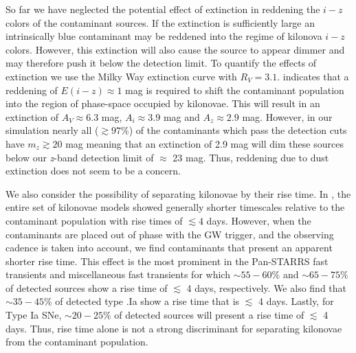 So far we have neglected the potential effect of extinction in reddening the $i-z$ colors of the contaminant sources. If the extinction is sufficiently large an intrinsically blue contaminant may be reddened into the regime of kilonova $i-z$ colors. However, this extinction will also cause the source to appear dimmer and may therefore push it below the detection limit. To quantify the effects of extinction we use the Milky Way extinction curve with $R_V = 3.1$.  indicates that a reddening of $E(i-z) \approx 1$ mag is required to shift the contaminant population into the region of phase-space occupied by kilonovae. This will result in an extinction of $A_V \approx 6.3$ mag, $A_i \approx 3.9$ mag and $A_z \approx 2.9$ mag.  However, in our simulation nearly all ($\gtrsim 97\%$) of the contaminants which pass the detection cuts have $m_z \gtrsim 20$ mag meaning that an extinction of 2.9 mag will dim these sources below our {\em z}-band detection limit of $\approx$ 23 mag. Thus, reddening due to dust extinction does not seem to be a concern.

\clearpage
We also consider the possibility of separating kilonovae by their rise time. In , the entire set of kilonovae models showed generally shorter timescales relative to the contaminant population with rise times of $\lesssim4$ days. However, when the contaminants are placed out of phase with the GW trigger, and the observing cadence is taken into account, we find contaminants that present an apparent shorter rise time. This effect is the most prominent in the Pan-STARRS fast transients and miscellaneous fast transients for which $\sim55-60\%$ and $\sim65-75\%$ of detected sources show a rise time of $\lesssim$ 4 days, respectively. We also find that $\sim 35-45\%$ of detected type .Ia show a rise time that is $\lesssim$ 4 days. Lastly, for Type Ia SNe, $\sim20-25\%$ of detected sources will present a rise time of $\lesssim$ 4 days. Thus, rise time alone is not a strong discriminant for separating kilonovae from the contaminant population.

